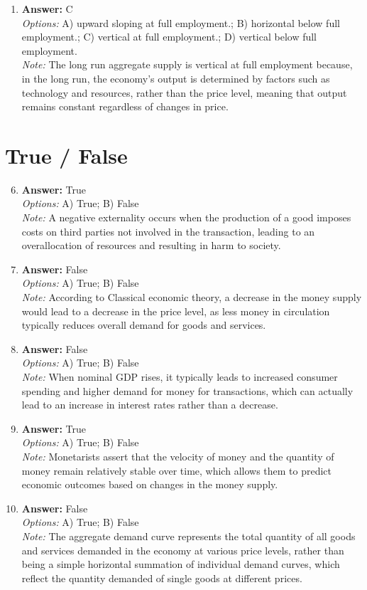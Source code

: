\documentclass[12pt]{article}
\begin{document}
\begin{enumerate}[label=\arabic*.]
\item \textbf{Answer:} C
\\ \textit{Options:} A) upward sloping at full employment.; B) horizontal below full employment.; C) vertical at full employment.; D) vertical below full employment.
\\ \textit{Note:} The long run aggregate supply is vertical at full employment because, in the long run, the economy's output is determined by factors such as technology and resources, rather than the price level, meaning that output remains constant regardless of changes in price.
\end{enumerate}

\section*{True / False}
\begin{enumerate}[label=\arabic*.]
\setcounter{enumi}{5}
\item \textbf{Answer:} True
\\ \textit{Options:} A) True; B) False
\\ \textit{Note:} A negative externality occurs when the production of a good imposes costs on third parties not involved in the transaction, leading to an overallocation of resources and resulting in harm to society.
\item \textbf{Answer:} False
\\ \textit{Options:} A) True; B) False
\\ \textit{Note:} According to Classical economic theory, a decrease in the money supply would lead to a decrease in the price level, as less money in circulation typically reduces overall demand for goods and services.
\item \textbf{Answer:} False
\\ \textit{Options:} A) True; B) False
\\ \textit{Note:} When nominal GDP rises, it typically leads to increased consumer spending and higher demand for money for transactions, which can actually lead to an increase in interest rates rather than a decrease.
\item \textbf{Answer:} True
\\ \textit{Options:} A) True; B) False
\\ \textit{Note:} Monetarists assert that the velocity of money and the quantity of money remain relatively stable over time, which allows them to predict economic outcomes based on changes in the money supply.
\item \textbf{Answer:} False
\\ \textit{Options:} A) True; B) False
\\ \textit{Note:} The aggregate demand curve represents the total quantity of all goods and services demanded in the economy at various price levels, rather than being a simple horizontal summation of individual demand curves, which reflect the quantity demanded of single goods at different prices.
\end{enumerate}
\end{document}
